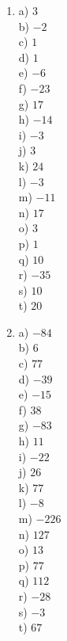 \documentclass{exam}
\begin{document}
\begin{multicols*}{4}
\begin{enumerate}
\item 	a) $3$ \\
		b) $-2$ \\
		c) $1$ \\
		d) $1$ \\
		e) $-6$ \\
		f) $-23$ \\
		g) $17$ \\
		h) $-14$ \\
		i) $-3$ \\
		j) $3$ \\
		k) $24$ \\
		l) $-3$ \\
		m) $-11$ \\
		n) $17$ \\
		o) $3$ \\
		p) $1$ \\
		q) $10$ \\
		r) $-35$ \\
		s) $10$ \\
		t) $20$ \\

\item 	a) $-84$ \\
		b) $6$ \\
		c) $77$ \\
		d) $-39$ \\
		e) $-15$ \\
		f) $38$ \\
		g) $-83$ \\
		h) $11$ \\
		i) $-22$ \\
		j) $26$ \\
		k) $77$ \\
		l) $-8$ \\
		m) $-226$ \\
		n) $127$ \\
		o) $13$ \\
		p) $77$ \\
		q) $112$ \\
		r) $-28$ \\
		s) $-3$ \\
		t) $67$ \\



\end{enumerate}
\end{multicols*}
\end{document}
